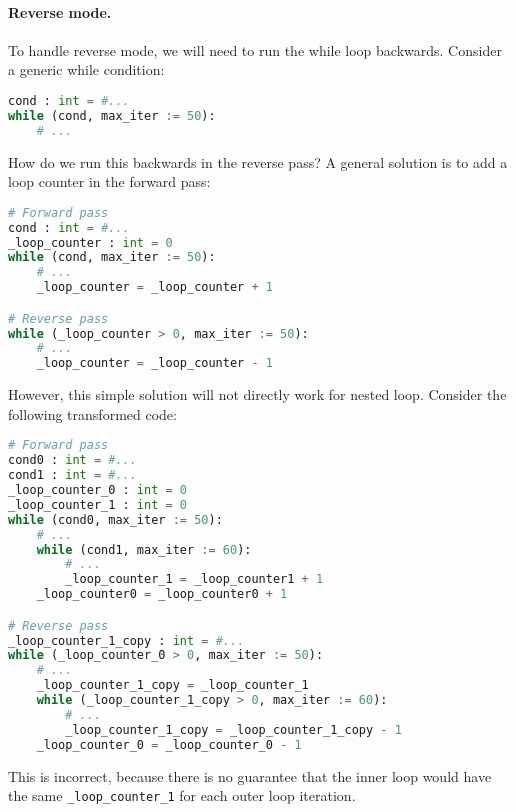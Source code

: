 \paragraph{Reverse mode.} To handle reverse mode, we will need to run the while loop backwards. Consider a generic while condition:
\begin{lstlisting}[language=Python]
cond : int = #...
while (cond, max_iter := 50):
    # ...
\end{lstlisting}
How do we run this backwards in the reverse pass? A general solution is to add a loop counter in the forward pass:
\begin{lstlisting}[language=Python]
# Forward pass
cond : int = #...
_loop_counter : int = 0
while (cond, max_iter := 50):
    # ...
    _loop_counter = _loop_counter + 1

# Reverse pass
while (_loop_counter > 0, max_iter := 50):
    # ...
    _loop_counter = _loop_counter - 1
\end{lstlisting}
However, this simple solution will not directly work for nested loop. Consider the following transformed code:
\begin{lstlisting}[language=Python]
# Forward pass
cond0 : int = #...
cond1 : int = #...
_loop_counter_0 : int = 0
_loop_counter_1 : int = 0
while (cond0, max_iter := 50):
    # ...
    while (cond1, max_iter := 60):
        # ...
        _loop_counter_1 = _loop_counter1 + 1
    _loop_counter0 = _loop_counter0 + 1

# Reverse pass
_loop_counter_1_copy : int = #...
while (_loop_counter_0 > 0, max_iter := 50):
    # ...
    _loop_counter_1_copy = _loop_counter_1
    while (_loop_counter_1_copy > 0, max_iter := 60):
        # ...
        _loop_counter_1_copy = _loop_counter_1_copy - 1
    _loop_counter_0 = _loop_counter_0 - 1
\end{lstlisting}
This is incorrect, because there is no guarantee that the inner loop would have the same \lstinline{_loop_counter_1} for each outer loop iteration.

